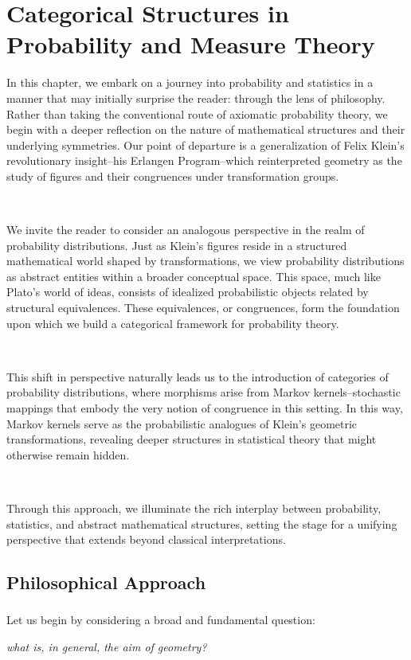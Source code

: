 \chapter{Categorical Structures in Probability and Measure Theory}
In this chapter, we embark on a journey into probability and statistics in a manner that may initially surprise the reader: through the lens of philosophy. Rather than taking the conventional route of axiomatic probability theory, we begin with a deeper reflection on the nature of mathematical structures and their underlying symmetries. Our point of departure is a generalization of Felix Klein’s revolutionary insight--his Erlangen Program--which reinterpreted geometry as the study of figures and their congruences under transformation groups.

\, 

We invite the reader to consider an analogous perspective in the realm of probability distributions. Just as Klein’s figures reside in a structured mathematical world shaped by transformations, we view probability distributions as abstract entities within a broader conceptual space. This space, much like Plato’s world of ideas, consists of idealized probabilistic objects related by structural equivalences. These equivalences, or congruences, form the foundation upon which we build a categorical framework for probability theory.

\, 

This shift in perspective naturally leads us to the introduction of categories of probability distributions, where morphisms arise from Markov kernels--stochastic mappings that embody the very notion of congruence in this setting. In this way, Markov kernels serve as the probabilistic analogues of Klein’s geometric transformations, revealing deeper structures in statistical theory that might otherwise remain hidden.

\, 

Through this approach, we illuminate the rich interplay between probability, statistics, and abstract mathematical structures, setting the stage for a unifying perspective that extends beyond classical interpretations.

\section{Philosophical Approach}
\subsection{}Let us begin by considering a broad and fundamental question: 
\begin{center} {\it what is, in general, the aim of geometry?}  
\end{center}

